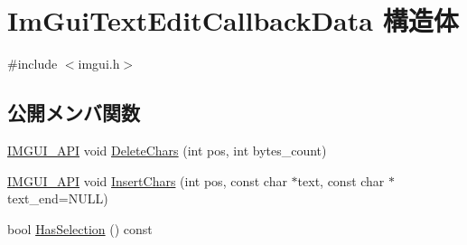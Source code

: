 \hypertarget{struct_im_gui_text_edit_callback_data}{}\section{Im\+Gui\+Text\+Edit\+Callback\+Data 構造体}
\label{struct_im_gui_text_edit_callback_data}


{\ttfamily \#include $<$imgui.\+h$>$}

\subsection*{公開メンバ関数}
\begin{DoxyCompactItemize}
\item 
\mbox{\hyperlink{imgui_8h_a43829975e84e45d1149597467a14bbf5}{I\+M\+G\+U\+I\+\_\+\+A\+PI}} void \mbox{\hyperlink{struct_im_gui_text_edit_callback_data_aaa702107677f7da0e7ea61311ab69af0}{Delete\+Chars}} (int pos, int bytes\+\_\+count)
\item 
\mbox{\hyperlink{imgui_8h_a43829975e84e45d1149597467a14bbf5}{I\+M\+G\+U\+I\+\_\+\+A\+PI}} void \mbox{\hyperlink{struct_im_gui_text_edit_callback_data_a78aa927e57bf5fb898ba5a168e9bcf63}{Insert\+Chars}} (int pos, const char $\ast$text, const char $\ast$text\+\_\+end=N\+U\+LL)
\item 
bool \mbox{\hyperlink{struct_im_gui_text_edit_callback_data_ac43cc964e6c1c829db3fdb71660ff604}{Has\+Selection}} () const
\end{DoxyCompactItemize}

